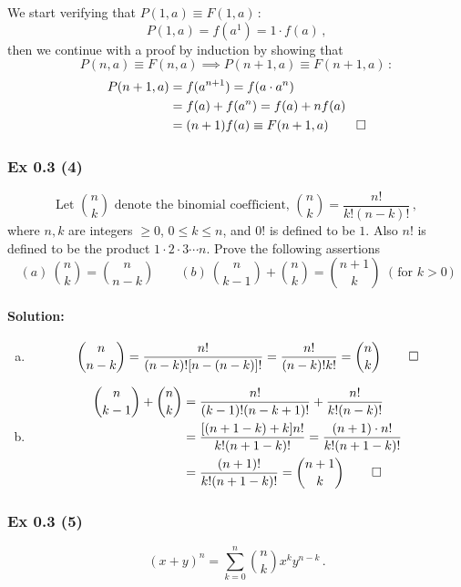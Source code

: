 {{We start verifying that $P(1, a) \equiv F(1, a)\,$:
$$ P(1, a) = f(a^1) = 1 \cdot f(a)\,,$$
then we continue with a proof by induction by showing that $$P(n, a) \equiv F(n, a) \implies P(n+1, a) \equiv F(n+1, a)\,:$$  
\begin{align*}
P(n+1, a) &= f(a^{n+1}) = f(a \cdot a^n) \\
          &= f(a) + f(a^n) = f(a) + n f(a)\\
          &= (n+1) f(a) \equiv F(n+1, a)\, \qed
\end{align*}

}


\subsubsection{Ex 0.3 (4)}\label{sec:Ex_0.3.4}
$$\text{Let } \binom{n}{k} \text{ denote the binomial coefficient, } \binom{n}{k} = \frac{n!}{k!(n-k)!}\,,$$
where $n, k$ are integers $\geq 0$, $0 \leq k \leq n$, and $0!$ is defined to be $1$.
Also $n!$ is defined to be the product $1 \cdot 2 \cdot 3 \cdots n$. Prove the following  assertions
$$ (a)\: \binom{n}{k} = \binom{n}{n-k}\qquad (b)\: \binom{n}{k-1} + \binom{n}{k} = \binom{n+1}{k}\: \text{  ( for }k > 0\,\text{)}$$

%
%
\paragraph{Solution:}{
\begin{enumerate}[(a)]
\item $$ \binom{n}{n-k} = \frac{n!}{(n-k)! [n - (n-k)]!} = \frac{n!}{(n-k)! k!} = \binom{n}{k}\,\qed$$
\item
\begin{align*}
\binom{n}{k-1} + \binom{n}{k} &= \frac{n!}{(k-1)! (n-k+1)!} +  \frac{n!}{k! (n-k)!}\\
                              &= \frac{[(n + 1 - k) + k] n!}{k! (n + 1 - k)!}  = \frac{(n+1)\cdot n!}{k!(n + 1 - k)!}\\
                              &= \frac{(n + 1)!}{k! (n + 1 - k)!} = \binom{n+1}{k}\, \qed
\end{align*}
\end{enumerate}
}


\subsubsection{Ex 0.3 (5)}\label{sec:Ex_0.3.5}
$$ (x + y)^n = \sum_{k=0}^n \binom{n}{k} x^k y ^{n-k}\,.$$
%
%
}
